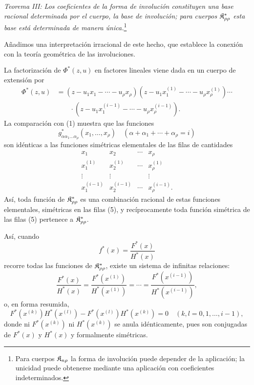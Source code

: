 \documentclass[11pt]{article}
\begin{document}
\emph{Teorema III: Los coeficientes de la forma de involución constituyen una base racional determinada por el cuerpo, la base de involución; para cuerpos $\mathfrak{K}^*_{\rho\rho}$ esta base está determinada de manera única.}\footnote{Para cuerpos $\mathfrak{K}_{n\rho}$ la forma de involución puede depender de la aplicación; la unicidad puede obtenerse mediante una aplicación con coeficientes indeterminados.}

Añadimos una interpretación irracional de este hecho, que establece la conexión con la teoría geométrica de las involuciones.

La factorización de $\Phi^*(z,u)$ en factores lineales viene dada en un cuerpo de extensión por
\begin{equation}
\begin{aligned}
 \Phi^*(z,u)&=(z-u_1x_1-\cdots-u_\rho x_\rho)
 (z-u_1x_1^{(1)}-\cdots-u_\rho x_\rho^{(1)})\cdots\\
 &\qquad\cdot
 (z-u_1x_1^{(i-1)}-\cdots-u_\rho x_\rho^{(i-1)}).
\end{aligned}
\tag{4}
\end{equation}
La comparación con (1) muestra que las funciones
\[
  g^*_{\alpha\alpha_1\ldots\alpha_\rho}(x_1,
  \ldots,x_\rho)\quad(\alpha+\alpha_1+\cdots+\alpha_\rho=i)
\]
son idénticas a las funciones simétricas elementales de las filas de cantidades
\begin{equation}
\begin{array}{cccc}
  x_1 & x_2 & \cdots & x_\rho\\
  x_1^{(1)} & x_2^{(1)} & \cdots & x_\rho^{(1)}\\
  \vdots & \vdots & & \vdots\\
  x_1^{(i-1)} & x_2^{(i-1)} & \cdots & x_\rho^{(i-1)}.
\end{array}
\tag{5}
\end{equation}
Así, toda función de $\mathfrak{K}^*_{\rho\rho}$ es una combinación racional de estas funciones elementales, simétricas en las filas (5), y recíprocamente toda función simétrica de las filas (5) pertenece a $\mathfrak{K}^*_{\rho\rho}$.

Así, cuando
\[
  f^*(x)=\frac{F^*(x)}{H^*(x)}
\]
recorre todas las funciones de $\mathfrak{K}^*_{\rho\rho}$, existe un sistema de infinitas relaciones:
\begin{equation}
  \frac{F^*(x)}{H^*(x)}=
  \frac{F^*(x^{(1)})}{H^*(x^{(1)})}=\cdots=
  \frac{F^*(x^{(i-1)})}{H^*(x^{(i-1)})},
\tag{6}
\end{equation}
o, en forma resumida,
\[
  F^*(x^{(k)})H^*(x^{(l)})-
  F^*(x^{(l)})H^*(x^{(k)})=0
  \quad(k,l=0,1,\ldots,i-1),
\]
donde ni $F^*(x^{(k)})$ ni $H^*(x^{(k)})$ se anula idénticamente, pues son conjugadas de $F^*(x)$ y $H^*(x)$ y formalmente simétricas.
\end{document}

